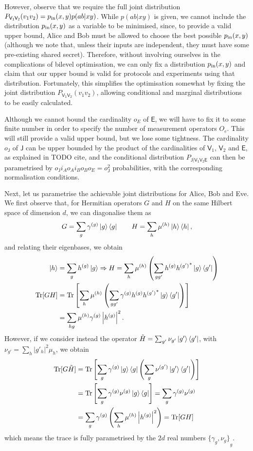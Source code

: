 \documentclass[10pt, a4paper]{article}
\numberwithin{equation}{section} %
\theoremstyle{definition}
\theoremstyle{plain}
\newcommand{\abs}[1]{\left\lvert#1\right\rvert}
\newcommand{\?}{\mathrel{?}} %
\newcommand{\Tr}{\mathrm{Tr}} %
\newcommand{\crv}[1]{\mathsf{#1}}
\begin{document}
    However, observe that we require the full joint distribution \(P_{\crv{V_1V_2}}(v_1v_2) = p_{\rm in}(x,y)p(ab|xy)\). While \(p(ab|xy)\) is given, we cannot include the distribution \(p_{\rm in}(x,y)\) as a variable to be minimised, since, to provide a valid upper bound, Alice and Bob must be allowed to choose the best possible \(p_{\rm in}(x,y)\) (although we note that, unless their inputs are independent, they must have some pre-existing shared secret). Therefore, without involving ourselves in the complications of bilevel optimisation, we can only fix a distribution \(p_{\rm in}(x,y)\) and claim that our upper bound is valid for protocols and experiments using that distribution. Fortunately, this simplifies the optimisation somewhat by fixing the joint distribution \(P_{\crv{V_1V_2}}(v_1v_2)\), allowing conditional and marginal distributions to be easily calculated.

    Although we cannot bound the cardinality \(o_E\) of \(\crv{E}\), we will have to fix it to some finite number in order to specify the number of measurement operators \(O_e\). This will still provide a valid upper bound, but we lose some tightness. The cardinality \(o_{\crv{J}}\) of \(\crv{J}\) can be upper bounded by the product of the cardinalities of \(\crv{V}_1\), \(\crv{V}_2\) and \(\crv{E}\), as explained in TODO cite, and the conditional distribution \(P_{\crv{J|V_1V_2E}}\) can then be parametrised by \(o_{\crv{J}} i_A o_A i_B o_B o_E = o_{\crv{J}}^2\) probabilities, with the corresponding normalisation conditions.

    Next, let us parametrise the achievable joint distributions for Alice, Bob and Eve. We first observe that, for Hermitian operators \(G\) and \(H\) on the same Hilbert space of dimension \(d\), we can diagonalise them as
    \[ G = \sum_g \gamma^{(g)} \ket{g}\bra{g} \qquad H = \sum_h \mu^{(h)} \ket{h}\bra{h}, \]
    and relating their eigenbases, we obtain
    \begin{align*}
      \ket{h} &= \sum_g h^{(g)} \ket{g} \Rightarrow H = \sum_h \mu^{(h)} \left(\sum_{gg'} h^{(g)} {h^{(g')}}^* \ket{g}\bra{g'}\right) \\
      \Tr[GH] &= \Tr\left[ \sum_h \mu^{(h)} \left( \sum_{gg'} \gamma^{(g)} h^{(g)} {h^{(g')}}^* \ket{g}\bra{g'} \right) \right] \\
      &= \sum_{hg} \mu^{(h)} \gamma^{(g)} \abs{h^{(g)}}^2.
    \end{align*}
    However, if we consider instead the operator \(\tilde{H} = \sum_{g'} \nu_{g'} \ket{g'}\bra{g'}\), with \(\nu_{g'} = \sum_h \abs{g'_h}^2 \mu_h\), we obtain
    \begin{align*}
      \Tr[G\tilde{H}] &= \Tr\left[ \sum_{g} \gamma^{(g)} \ket{g}\bra{g} \left( \sum_g \nu^{(g')} \ket{g'}\bra{g'} \right) \right] \\
      &= \Tr\left[ \sum_{g} \gamma^{(g)}\nu^{(g)}\ket{g}\bra{g} \right] = \sum_{g} \gamma^{(g)}\nu^{(g)} \\
      &= \sum_{g} \gamma^{(g)} \left(\sum_{h} \mu^{(h)} \abs{h^{(g)}}^2\right) = \Tr[GH]
    \end{align*}
    which means the trace is fully parametrised by the \(2d\) real numbers \({\{\gamma_g, \nu_{g}\}}_{g}\).
\end{document}
